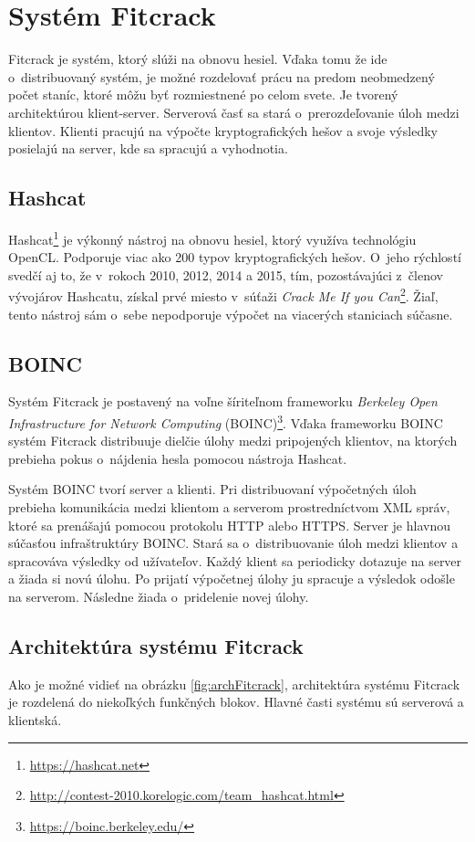 \documentclass[../projekt.tex]{subfiles}
\begin{document}
\chapter{Systém Fitcrack}\label{Fitcrack}
Fitcrack je systém, ktorý slúži na obnovu hesiel. Vďaka tomu že ide o~distribuovaný systém, je možné rozdelovať prácu na predom neobmedzený počet staníc, ktoré môžu byť rozmiestnené po celom svete. Je tvorený  architektúrou klient-server. Serverová časť sa stará o~prerozdeľovanie úloh medzi klientov. Klienti pracujú na výpočte kryptografických hešov a svoje výsledky posielajú na server, kde sa spracujú a vyhodnotia.
\cite{fitcrackSprava}


\label{hashcat}
\section{Hashcat}
Hashcat\footnote{\url{https://hashcat.net}} je výkonný nástroj na obnovu hesiel, ktorý využíva technológiu OpenCL. Podporuje viac ako 200 typov kryptografických hešov. O~jeho rýchlostí svedčí aj to, že v~rokoch 2010, 2012, 2014 a 2015, tím, pozostávajúci z~členov vývojárov Hashcatu, získal prvé miesto v~súťaži \textit{Crack Me If you Can}\footnote{\url{http://contest-2010.korelogic.com/team_hashcat.html}}. Žiaľ, tento nástroj sám o~sebe nepodporuje výpočet na viacerých staniciach súčasne.


\section{BOINC}
Systém Fitcrack je postavený na voľne šíriteľnom frameworku \textit{Berkeley Open Infrastructure for Network Computing} (BOINC)\footnote{\url{https://boinc.berkeley.edu/}}. Vďaka frameworku BOINC systém Fitcrack distribuuje dielčie úlohy medzi pripojených klientov, na ktorých prebieha pokus o~nájdenia hesla pomocou nástroja Hashcat.

Systém BOINC tvorí server a klienti. Pri distribuovaní výpočetných úloh prebieha komunikácia medzi klientom a serverom prostredníctvom XML správ, ktoré sa prenášajú pomocou protokolu HTTP alebo HTTPS.
Server je hlavnou súčasťou infraštruktúry BOINC. Stará sa o~distribuovanie úloh medzi klientov a spracováva výsledky od užívateľov.
Každý klient sa periodicky dotazuje na server a žiada si novú úlohu. Po prijatí výpočetnej úlohy ju spracuje a výsledok odošle na serverom. Následne žiada o~pridelenie novej úlohy.\cite{boinccitace}


\section{Architektúra systému Fitcrack}
Ako je možné vidieť na obrázku \ref{fig:archFitcrack}, architektúra systému Fitcrack je rozdelená do niekoľkých funkčných blokov. Hlavné časti systému sú serverová a klientská.
\end{document}
